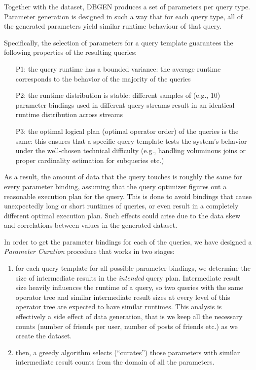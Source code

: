Together with the dataset, DBGEN produces a set of parameters per
query type. Parameter generation is designed in such a way that for each query
type, all of the generated parameters yield similar runtime behaviour of that
query. 

Specifically, the selection of parameters for a query template guarantees the following properties of the resulting queries:
\begin{enumerate}
\item[P1:] the query runtime has a bounded variance: the average runtime corresponds to the behavior of the majority of the queries
\item[P2:] the runtime distribution is stable: different samples of (e.g., 10) parameter bindings used in different query streams result in an identical runtime distribution across streams
\item[P3:] the optimal logical plan (optimal operator order) of the queries is the same: this ensures that a specific query template tests the system's behavior under the well-chosen technical difficulty (e.g., handling voluminous joins or proper cardinality estimation for subqueries etc.)
\end{enumerate}


As a result, the amount of data that the query touches is roughly the
same for every parameter binding, assuming that the query optimizer figures out a
reasonable execution plan for the query. This is done to avoid bindings that
cause unexpectedly long or short runtimes of queries, or even result in a
completely different optimal execution plan. Such effects could arise due to
the data skew and correlations between values in the generated dataset.

In order to get the parameter bindings for each of the queries, we have designed a \textit{Parameter Curation} procedure that works in two stages:

\begin{enumerate}
\item for each query template for all possible parameter bindings, we determine the size of intermediate results in the {\em intended} query plan. Intermediate result size heavily influences the runtime of a query, so two queries with the same operator tree and similar intermediate result sizes at every level of this operator tree are expected to have similar runtimes. This analysis is effectively a side effect of data generation, that is we keep all the necessary counts (number of friends per user, number of posts of friends etc.) as we create the dataset. 
\item then, a greedy algorithm selects (``curates'') those parameters with similar intermediate result counts from the domain of all the parameters. 
\end{enumerate}

